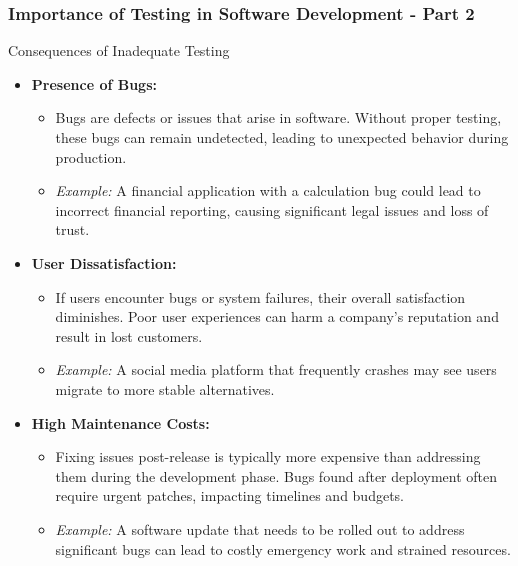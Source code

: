 \documentclass{beamer}
\begin{document}
\begin{frame}[fragile]
    \frametitle{Importance of Testing in Software Development - Part 2}
    \begin{block}{Consequences of Inadequate Testing}
        \begin{itemize}
            \item \textbf{Presence of Bugs:} 
                \begin{itemize}
                    \item Bugs are defects or issues that arise in software. Without proper testing, these bugs can remain undetected, leading to unexpected behavior during production.
                    \item \textit{Example:} A financial application with a calculation bug could lead to incorrect financial reporting, causing significant legal issues and loss of trust.
                \end{itemize}

            \item \textbf{User Dissatisfaction:}
                \begin{itemize}
                    \item If users encounter bugs or system failures, their overall satisfaction diminishes. Poor user experiences can harm a company's reputation and result in lost customers.
                    \item \textit{Example:} A social media platform that frequently crashes may see users migrate to more stable alternatives.
                \end{itemize}

            \item \textbf{High Maintenance Costs:}
                \begin{itemize}
                    \item Fixing issues post-release is typically more expensive than addressing them during the development phase. Bugs found after deployment often require urgent patches, impacting timelines and budgets.
                    \item \textit{Example:} A software update that needs to be rolled out to address significant bugs can lead to costly emergency work and strained resources.
                \end{itemize}
        \end{itemize}
    \end{block}
\end{frame}
\end{document}
